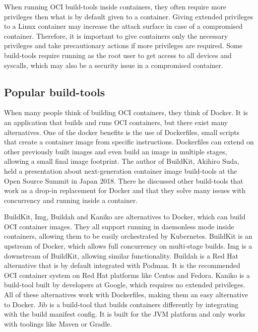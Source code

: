 When running OCI build-tools inside containers, they often require more privileges then what is by default given to a container. Giving extended privileges to a Linux container may increase the attack surface in case of a compromised container. Therefore, it is important to give containers only the necessary privileges and take precautionary actions if more privileges are required. Some build-tools require running as the root user to get access to all devices and syscalls, which may also be a security issue in a compromised container. 
\subsection{Popular build-tools}
When many people think of building OCI containers, they think of Docker. It is an application that builds and runs OCI containers, but there exist many alternatives. One of the docker benefits is the use of Dockerfiles, small scripts that create a container image from specific instructions. Dockerfiles can extend on other previously built images and even build an image in multiple stages, allowing a small final image footprint. The author of BuildKit, Akihiro Suda, held a presentation about next-generation container image build-tools at the Open Source Summit in Japan 2018\cite{oci_slides}. There he discussed other build-tools that work as a drop-in replacement for Docker and that they solve many issues with concurrency and running inside a container. 

BuildKit\cite{github_buildkit}, Img\cite{github_img}, Buildah\cite{github_buildah} and Kaniko\cite{github_kaniko} are alternatives to Docker, which can build OCI container images. They all support running in daemonless mode inside containers, allowing them to be easily orchestrated by Kubernetes. BuildKit is an upstream of Docker, which allows full concurrency on multi-stage builds. Img is a downstream of BuildKit, allowing similar functionality. Buildah is a Red Hat alternative that is by default integrated with Podman. It is the recommended OCI container system on Red Hat platforms like Centos and Fedora. Kaniko is a build-tool built by developers at Google, which requires no extended privileges. All of these alternatives work with Dockerfiles, making them an easy alternative to Docker. Jib\cite{github_jib} is a build-tool that builds containers differently by integrating with the build manifest config. It is built for the JVM platform and only works with toolings like Maven or Gradle. 


